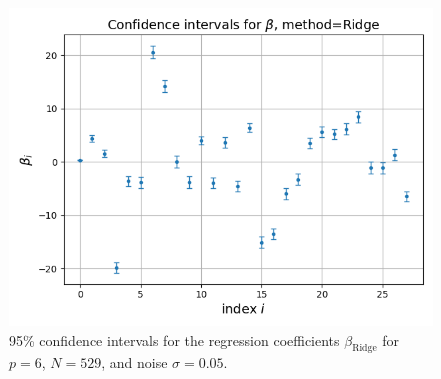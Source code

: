 \documentclass[a4paper]{article}
\begin{document}
\begin{figure}[H]
	\centering
	\includegraphics[scale=0.5]{../figures/task_d/beta_conf_int_Ridge_N529_pmax20_nlamb20_noise0.05_seed4155_beta28.png}
	\caption{95\% confidence intervals for the regression coefficients $\beta_{\text{Ridge}}$ for $p=6$, $N=529$, and noise $\sigma=0.05$.}
	\label{fig:beta_ridge}
\end{figure}
\end{document}
